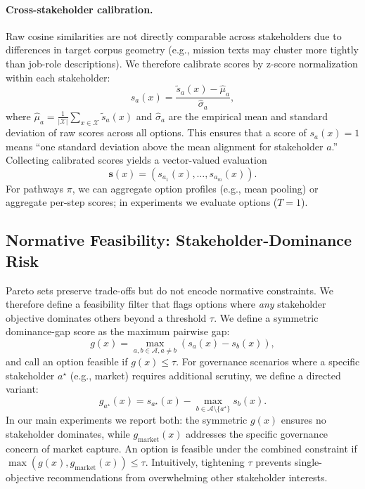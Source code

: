 \documentclass[sigconf,review]{acmart}
\begin{document}
\paragraph{Cross-stakeholder calibration.}
Raw cosine similarities are not directly comparable across stakeholders due to differences in target corpus geometry (e.g., mission texts may cluster more tightly than job-role descriptions). We therefore calibrate scores by z-score normalization within each stakeholder:
\begin{equation}
  s_a(x) = \frac{\tilde{s}_a(x) - \hat{\mu}_a}{\hat{\sigma}_a},
\end{equation}
where $\hat{\mu}_a = \frac{1}{|\mathcal{X}|}\sum_{x \in \mathcal{X}} \tilde{s}_a(x)$ and $\hat{\sigma}_a$ are the empirical mean and standard deviation of raw scores across all options. This ensures that a score of $s_a(x) = 1$ means ``one standard deviation above the mean alignment for stakeholder $a$.''
Collecting calibrated scores yields a vector-valued evaluation
\begin{equation}
  \mathbf{s}(x) = (s_{a_1}(x),\dots,s_{a_m}(x)).
\end{equation}
For pathways $\pi$, we can aggregate option profiles (e.g., mean pooling) or aggregate per-step scores; in experiments we evaluate options ($T{=}1$).

\subsection{Normative Feasibility: Stakeholder-Dominance Risk}
\label{subsec:constraint}
Pareto sets preserve trade-offs but do not encode normative constraints. We therefore define a feasibility filter that flags options where \emph{any} stakeholder objective dominates others beyond a threshold $\tau$.
We define a symmetric dominance-gap score as the maximum pairwise gap:
\begin{equation}
  g(x) = \max_{a,b \in \mathcal{A}, a \neq b} \left( s_a(x) - s_b(x) \right),
\end{equation}
and call an option feasible if $g(x) \le \tau$. For governance scenarios where a specific stakeholder $a^\star$ (e.g., market) requires additional scrutiny, we define a directed variant:
\begin{equation}
  g_{a^\star}(x) = s_{a^\star}(x) - \max_{b\in\mathcal{A}\setminus\{a^\star\}} s_b(x).
\end{equation}
In our main experiments we report both: the symmetric $g(x)$ ensures no stakeholder dominates, while $g_{\text{market}}(x)$ addresses the specific governance concern of market capture. An option is feasible under the combined constraint if $\max(g(x), g_{\text{market}}(x)) \le \tau$.
Intuitively, tightening $\tau$ prevents single-objective recommendations from overwhelming other stakeholder interests.
\end{document}
